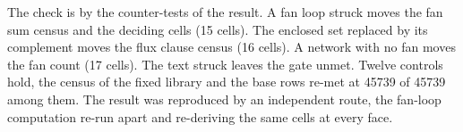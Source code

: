 \begin{chproof}[census]
The check is by the counter-tests of the result. A fan loop struck moves the fan sum census and the deciding cells (15 cells). The enclosed set replaced by its complement moves the flux clause census (16 cells). A network with no fan moves the fan count (17 cells). The text struck leaves the gate unmet. Twelve controls hold, the census of the fixed library and the base rows re-met at 45739 of 45739 among them.
The result was reproduced by an independent route, the fan-loop computation re-run apart and re-deriving the same cells at every face.
\end{chproof}
\clearpage
\label{atlaspart:instrumentsend}

